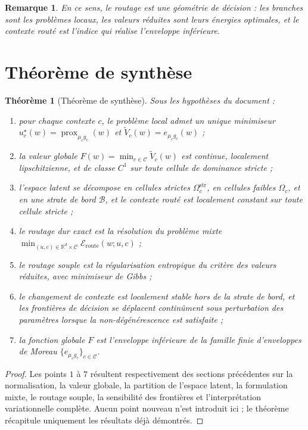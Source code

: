 \documentclass[11pt,a4paper]{article}
\newtheorem{theorem}{Théorème}[section]
\newtheorem{remark}{Remarque}[section]
\DeclareMathOperator{\prox}{prox}
\newcommand{\R}{\mathbb R}
\newcommand{\Ccal}{\mathcal C}
\begin{document}
\begin{remark}
En ce sens, le routage est une géométrie de décision : les branches sont les problèmes locaux, les valeurs réduites sont leurs énergies optimales, et le contexte routé est l'indice qui réalise l'enveloppe inférieure.
\end{remark}

\section{Théorème de synthèse}

\begin{theorem}[Théorème de synthèse]
Sous les hypothèses du document :
\begin{enumerate}[leftmargin=2em]
\item pour chaque contexte \(c\), le problème local admet un unique minimiseur \(u_c^\star(w)=\prox_{\mu_c g_c}(w)\) et \(\widetilde V_c(w)=e_{\mu_c g_c}(w)\) ;
\item la valeur globale \(F(w)=\min_{c\in\Ccal}\widetilde V_c(w)\) est continue, localement lipschitzienne, et de classe \(C^1\) sur toute cellule de dominance stricte ;
\item l'espace latent se décompose en cellules strictes \(\Omega_c^{\mathrm{str}}\), en cellules faibles \(\Omega_c\), et en une strate de bord \(\mathcal B\), et le contexte routé est localement constant sur toute cellule stricte ;
\item le routage dur exact est la résolution du problème mixte \(\min_{(u,c)\in\R^d\times\Ccal}\mathcal E_{\mathrm{route}}(w;u,c)\) ;
\item le routage souple est la régularisation entropique du critère des valeurs réduites, avec minimiseur de Gibbs ;
\item le changement de contexte est localement stable hors de la strate de bord, et les frontières de décision se déplacent continûment sous perturbation des paramètres lorsque la non-dégénérescence est satisfaite ;
\item la fonction globale \(F\) est l'enveloppe inférieure de la famille finie d'enveloppes de Moreau \(\{e_{\mu_c g_c}\}_{c\in\Ccal}\).
\end{enumerate}
\end{theorem}

\begin{proof}
Les points \(1\) à \(7\) résultent respectivement des sections précédentes sur la normalisation, la valeur globale, la partition de l'espace latent, la formulation mixte, le routage souple, la sensibilité des frontières et l'interprétation variationnelle complète. Aucun point nouveau n'est introduit ici ; le théorème récapitule uniquement les résultats déjà démontrés.
\end{proof}
\end{document}
